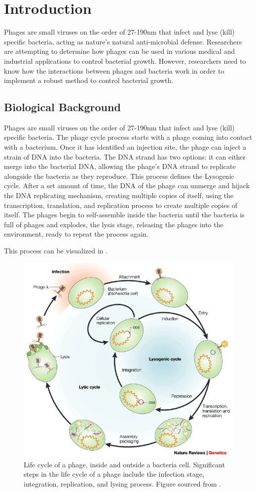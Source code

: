\chapter{Introduction}
\label{Introduction}

Phages are small viruses on the order of 27-190nm that infect and lyse (kill) specific bacteria, acting as nature's natural anti-microbial defense. 
Researchers are attempting to determine how phages can be used in various medical and industrial applications to control bacterial growth. 
However, researchers need to know how the interactions between phages and bacteria work in order to implement a robust method to control bacterial growth. \newline 

\section{Biological Background}
Phages are small viruses on the order of 27-190nm that infect and lyse (kill) specific bacteria.
The phage cycle process starts with a phage coming into contact with a bacterium.
Once it has identified an injection site, the phage can inject a strain of DNA into the bacteria.
The DNA strand has two options: it can either merge into the bacterial DNA, allowing the phage's DNA strand to replicate alongside the bacteria as they reproduce.
This process defines the Lysogenic cycle.
After a set amount of time, the DNA of the phage can unmerge and hijack the DNA replicating mechanism, creating multiple copies of itself, using the transcription, translation, and replication process to create multiple copies of itself.
The phages begin to self-assemble inside the bacteria until the bacteria is full of phages and explodes, the lysis stage, releasing the phages into the environment, ready to repeat the process again. 

This process can be visualized in  \cite{campbellFutureBacteriophageBiology2003}.
\begin{figure}
    \centering
    \includegraphics[width=0.5\linewidth]{Figures/phage_life_cycle.png}
    \caption{Life cycle of a phage, inside and outside a bacteria cell. Significant steps in the life cycle of a phage include the infection stage, integration, replication, and lysing process. Figure sourced from \citet{campbellFutureBacteriophageBiology2003}. }
    \label{fig:phage_life_cycle}
\end{figure}

